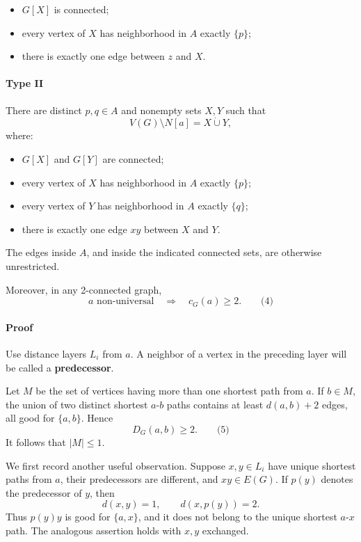 \documentclass[
  11pt,
  a4paper,
]{article}
\newcounter{none} %
\providecommand{\tightlist}{%
  \setlength{\itemsep}{0pt}\setlength{\parskip}{0pt}}
\begin{document}
\begin{itemize}
\tightlist
\item
  \(G[X]\) is connected;
\item
  every vertex of \(X\) has neighborhood in \(A\) exactly \(\{p\}\);
\item
  there is exactly one edge between \(z\) and \(X\).
\end{itemize}

\paragraph{Type II}\label{type-ii}

There are distinct \(p,q\in A\) and nonempty sets \(X,Y\) such that \[
V(G)\setminus N[a]=X\mathbin{\dot\cup}Y,
\] where:

\begin{itemize}
\tightlist
\item
  \(G[X]\) and \(G[Y]\) are connected;
\item
  every vertex of \(X\) has neighborhood in \(A\) exactly \(\{p\}\);
\item
  every vertex of \(Y\) has neighborhood in \(A\) exactly \(\{q\}\);
\item
  there is exactly one edge \(xy\) between \(X\) and \(Y\).
\end{itemize}

The edges inside \(A\), and inside the indicated connected sets, are
otherwise unrestricted.

Moreover, in any 2-connected graph, \[
a\text{ non-universal}\quad\Longrightarrow\quad c_G(a)\ge2.
\qquad\text{(4)}
\]

\paragraph{Proof}\label{proof-1}

Use distance layers \(L_i\) from \(a\). A neighbor of a vertex in the
preceding layer will be called a \textbf{predecessor}.

Let \(M\) be the set of vertices having more than one shortest path from
\(a\). If \(b\in M\), the union of two distinct shortest \(a\)-\(b\)
paths contains at least \(d(a,b)+2\) edges, all good for \(\{a,b\}\).
Hence \[
D_G(a,b)\ge2.
\qquad\text{(5)}
\] It follows that \(|M|\le1\).

We first record another useful observation. Suppose \(x,y\in L_i\) have
unique shortest paths from \(a\), their predecessors are different, and
\(xy\in E(G)\). If \(p(y)\) denotes the predecessor of \(y\), then \[
d(x,y)=1,\qquad d(x,p(y))=2.
\] Thus \(p(y)y\) is good for \(\{a,x\}\), and it does not belong to the
unique shortest \(a\)-\(x\) path. The analogous assertion holds with
\(x,y\) exchanged.
\end{document}

